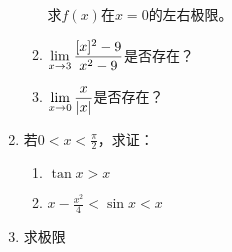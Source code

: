 \begin{ex}
\begin{enumerate}
\begin{enumerate}
    求$f(x)$在$x=0$的左右极限。

    \item $\displaystyle\lim_{x\to 3}\dfrac{[x]^2-9}{x^2-9}$是否存在？
    \item $\displaystyle\lim_{x\to 0}\dfrac{x}{|x|}$是否存在？
\end{enumerate}

\item 若$0<x<\frac{\pi}{2}$，求证：
\begin{multicols}{2}
    \begin{enumerate}
        \item $\tan x>x$
        \item $x-\frac{x^2}{4}<\sin x<x$
    \end{enumerate}
\end{multicols}

\item 求极限  
\begin{enumerate}
\end{enumerate}   

\end{enumerate}
\end{ex}

